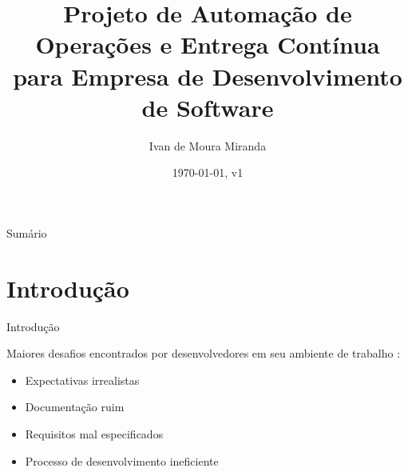 \documentclass[aspectratio=169]{beamer}
\title{Projeto de Automação de Operações e Entrega Contínua para Empresa de Desenvolvimento de Software}
\author{Ivan de Moura Miranda}
\institute{Faculdade Presidente Antônio Carlos
	    \par
	    Engenharia de Computação}
\date{\today, v1}
\begin{document}

\begin{frame}{Sumário}
\tableofcontents
\end{frame}

\section{Introdução}

\begin{frame}{Introdução}

Maiores desafios encontrados por desenvolvedores em seu ambiente de trabalho \cite{StackOverflow:DeveloperSurvey2016}:

\begin{itemize}
	\item Expectativas irrealistas
	
	\item Documentação ruim
	
	\item Requisitos mal especificados
	
	\item Processo de desenvolvimento ineficiente
\end{itemize}

\end{frame}
\end{document}
